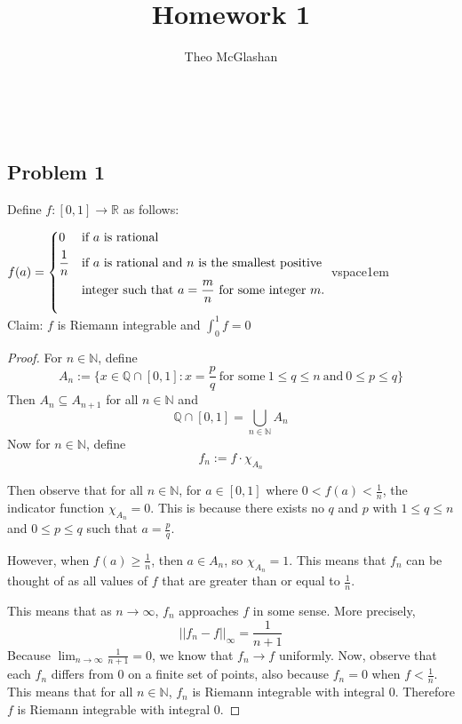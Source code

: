 \documentclass[12pt]{article}
\title{Homework 1}
\author{Theo McGlashan}
\date{}
\begin{document}
\maketitle
\newpage
\
\newpage

\subsection*{Problem 1}

Define $f: [0,1] \to \mathbb{R}$ as follows:

\vspace{1em}
$f(a) = \begin{dcases} 
            0 & \text{if}~a~\text{is rational} \\
            \frac{1}{n} & \text{if}~a~\text{is rational and}~n~\text{is the smallest positive} \\
            & \text{integer such that}~a = \frac{m}{n}~\text{for some integer}~m.
            \vspace{1em} \\
        \end{dcases}$
vspace{1em}\\
Claim: $f$ is Riemann integrable and $\int_0^1 f = 0$
\begin{proof}

For $n \in \mathbb{N}$, define $$A_n := \{ x \in \mathbb{Q} \cap [0,1] : x = \frac{p}{q}~\text{for some}~ 1 \leq q \leq n ~\text{and}~ 0 \leq p \leq q \}$$ Then $A_n \subseteq A_{n+1}$ for all $n \in \mathbb{N}$ and $$\mathbb{Q} \cap [0,1] = \bigcup_{n \in \mathbb{N}} A_n$$ Now for $n \in \mathbb{N}$, define $$f_n := f \cdot \chi_{A_n}$$

Then observe that for all $n \in \mathbb{N}$, for $a \in [0,1]$ where $0 < f(a) < \frac{1}{n}$, the indicator function $\chi_{A_n} = 0$. This is because there exists no $q$ and $p$ with $1 \leq q \leq n$ and $0 \leq p \leq q$ such that $a = \frac{p}{q}$.

However, when $f(a) \geq \frac{1}{n}$, then $a \in A_n$, so $\chi_{A_n} = 1$. This means that $f_n$ can be thought of as all values of $f$ that are greater than or equal to $\frac{1}{n}$.

This means that as $n \to \infty$, $f_n$ approaches $f$ in some sense. More precisely, $$||f_n - f||_\infty = \frac{1}{n+1}$$ Because $\lim_{n \to \infty} \frac{1}{n+1} = 0$, we know that $f_n \to f$ uniformly. Now, observe that each $f_n$ differs from $0$ on a finite set of points, also because $f_n = 0$ when $f < \frac{1}{n}$. This means that for all $n \in \mathbb{N}$, $f_n$ is Riemann integrable with integral $0$. Therefore $f$ is Riemann integrable with integral $0$.
\end{proof}
\end{document}
